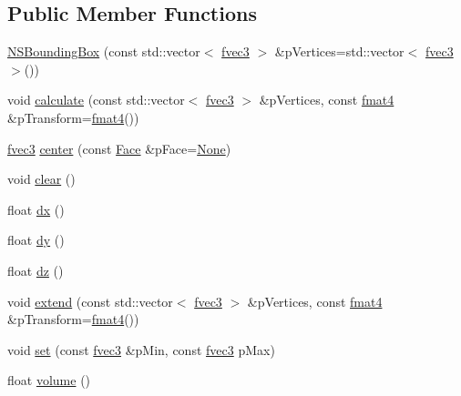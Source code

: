 \subsection*{Public Member Functions}
\begin{DoxyCompactItemize}
\item 
\hyperlink{structNSBoundingBox_a6392f91e736e33674a7b17ee3a003da5}{N\-S\-Bounding\-Box} (const std\-::vector$<$ \hyperlink{nsmath_8h_acc70582cd75ef520905deb63211e4b52}{fvec3} $>$ \&p\-Vertices=std\-::vector$<$ \hyperlink{nsmath_8h_acc70582cd75ef520905deb63211e4b52}{fvec3} $>$())
\item 
void \hyperlink{structNSBoundingBox_a63001de3b290ef19ed63e46f7e949d65}{calculate} (const std\-::vector$<$ \hyperlink{nsmath_8h_acc70582cd75ef520905deb63211e4b52}{fvec3} $>$ \&p\-Vertices, const \hyperlink{nsmath_8h_ae867bb2ea15fd3e2c452911a1c929538}{fmat4} \&p\-Transform=\hyperlink{nsmath_8h_ae867bb2ea15fd3e2c452911a1c929538}{fmat4}())
\item 
\hyperlink{nsmath_8h_acc70582cd75ef520905deb63211e4b52}{fvec3} \hyperlink{structNSBoundingBox_aafdeb08087bb7c3aeeaae668edc16f94}{center} (const \hyperlink{structNSBoundingBox_a6cc652314d1c87dcedda3eaa21f1d3e3}{Face} \&p\-Face=\hyperlink{structNSBoundingBox_a6cc652314d1c87dcedda3eaa21f1d3e3a745378f1b978fbeb020a885e0b12282a}{None})
\item 
void \hyperlink{structNSBoundingBox_a7de92ab5607c0be1dccc26103512b382}{clear} ()
\item 
float \hyperlink{structNSBoundingBox_a88cc0a3d49be3e1492b0a262a89ac12f}{dx} ()
\item 
float \hyperlink{structNSBoundingBox_a5d625d3195e80d5620ad89357297607e}{dy} ()
\item 
float \hyperlink{structNSBoundingBox_a804419300fa56b28aa635a5e7d115e53}{dz} ()
\item 
void \hyperlink{structNSBoundingBox_a5a2bf193567c0d374968aba39f6b7127}{extend} (const std\-::vector$<$ \hyperlink{nsmath_8h_acc70582cd75ef520905deb63211e4b52}{fvec3} $>$ \&p\-Vertices, const \hyperlink{nsmath_8h_ae867bb2ea15fd3e2c452911a1c929538}{fmat4} \&p\-Transform=\hyperlink{nsmath_8h_ae867bb2ea15fd3e2c452911a1c929538}{fmat4}())
\item 
void \hyperlink{structNSBoundingBox_afc5af6303097994df1c468099538da97}{set} (const \hyperlink{nsmath_8h_acc70582cd75ef520905deb63211e4b52}{fvec3} \&p\-Min, const \hyperlink{nsmath_8h_acc70582cd75ef520905deb63211e4b52}{fvec3} p\-Max)
\item 
float \hyperlink{structNSBoundingBox_a18e09e658dc5aa1e93106143eb4c1a10}{volume} ()
\end{DoxyCompactItemize}
